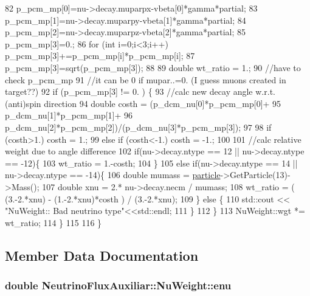 \begin{DoxyCode}
82       p\_pcm\_mp[0]=nu->decay.muparpx-vbeta[0]*gamma*partial;
83       p\_pcm\_mp[1]=nu->decay.muparpy-vbeta[1]*gamma*partial;
84       p\_pcm\_mp[2]=nu->decay.muparpz-vbeta[2]*gamma*partial;
85       p\_pcm\_mp[3]=0.;
86       \textcolor{keywordflow}{for} (\textcolor{keywordtype}{int} i=0;i<3;i++) p\_pcm\_mp[3]+=p\_pcm\_mp[i]*p\_pcm\_mp[i];
87       p\_pcm\_mp[3]=sqrt(p\_pcm\_mp[3]);
88 
89       \textcolor{keywordtype}{double} wt\_ratio = 1.;
90       \textcolor{comment}{//have to check p\_pcm\_mp}
91       \textcolor{comment}{//it can be 0 if mupar..=0. (I guess muons created in target??)}
92       \textcolor{keywordflow}{if} (p\_pcm\_mp[3] != 0. ) \{
93         \textcolor{comment}{//calc new decay angle w.r.t. (anti)spin direction}
94         \textcolor{keywordtype}{double} costh = (p\_dcm\_nu[0]*p\_pcm\_mp[0]+ 
95                         p\_dcm\_nu[1]*p\_pcm\_mp[1]+ 
96                         p\_dcm\_nu[2]*p\_pcm\_mp[2])/(p\_dcm\_nu[3]*p\_pcm\_mp[3]);
97 
98         \textcolor{keywordflow}{if} (costh>1.) costh = 1.;
99         \textcolor{keywordflow}{else} \textcolor{keywordflow}{if} (costh<-1.) costh = -1.;
100 
101         \textcolor{comment}{//calc relative weight due to angle difference}
102         \textcolor{keywordflow}{if}(nu->decay.ntype == 12 || nu->decay.ntype == -12)\{
103           wt\_ratio = 1.-costh;
104         \}
105         \textcolor{keywordflow}{else} \textcolor{keywordflow}{if}(nu->decay.ntype == 14 || nu->decay.ntype == -14)\{
106           \textcolor{keywordtype}{double} mumass = \hyperlink{class_neutrino_flux_auxiliar_1_1_nu_weight_aa35fc1d624cd975a9657f1a081a776ca}{particle}->GetParticle(13)->Mass(); 
107           \textcolor{keywordtype}{double} xnu = 2.* nu->decay.necm / mumass;
108           wt\_ratio = ( (3.-2.*xnu) - (1.-2.*xnu)*costh ) / (3.-2.*xnu);
109         \} \textcolor{keywordflow}{else} \{
110           std::cout << \textcolor{stringliteral}{"NuWeight:: Bad neutrino type"}<<std::endl;
111         \}
112       \}
113       NuWeight::wgt *= wt\_ratio;
114     \}
115 
116   \}
\end{DoxyCode}


\subsection{Member Data Documentation}
\hypertarget{class_neutrino_flux_auxiliar_1_1_nu_weight_aaf30ef23c7cf98ecbda310a777d0b8aa}{
\subsubsection[{enu}]{\setlength{\rightskip}{0pt plus 5cm}double Neutrino\-Flux\-Auxiliar\-::\-Nu\-Weight\-::enu}}\label{class_neutrino_flux_auxiliar_1_1_nu_weight_aaf30ef23c7cf98ecbda310a777d0b8aa}


